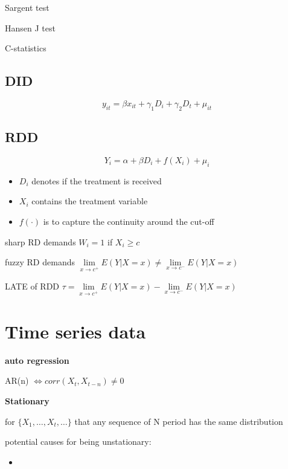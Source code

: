 \documentclass{article}
\providecommand{\tightlist}{
  \setlength{\itemsep}{0pt}
  \setlength{\parskip}{0pt}}
\begin{document}
Sargent test

Hansen J test

C-statistics

\subsection{DID}

\begin{equation}
  y_{it}=\beta x_{it} + \gamma_1 D_i +\gamma_2 D_t + \mu_{it}
\end{equation}


\subsection{RDD}
\begin{equation}
  Y_i = \alpha + \beta D_i + f(X_i) + \mu_i 
\end{equation}

\begin{itemize}
\tightlist
  \item $D_i$ denotes if the treatment is received
  \item $X_i$ contains the treatment variable
  \item $f(\cdot)$ is to capture the continuity around the cut-off
\end{itemize}

sharp RD demands $W_i=1$ if $X_i\geqslant c$

fuzzy RD demands $\lim\limits_{x \rightarrow c^+} E(Y|X=x)\neq\lim\limits_{x \rightarrow c^-} E(Y|X=x)$

LATE of RDD $\tau=\lim\limits_{x \rightarrow c^+} E(Y|X=x)-\lim\limits_{x \rightarrow c^-} E(Y|X=x)$


\section{Time series data}

\textbf{auto regression}

AR(n) $\iff corr(X_t,X_{t-n})\neq 0$

\textbf{Stationary}

for $\{X_1,\dots,X_t,\dots\}$ that any sequence of N period has the same distribution

potential causes for being unstationary:
\begin{itemize}
\tightlist
  \item 
\end{itemize}
\end{document}
